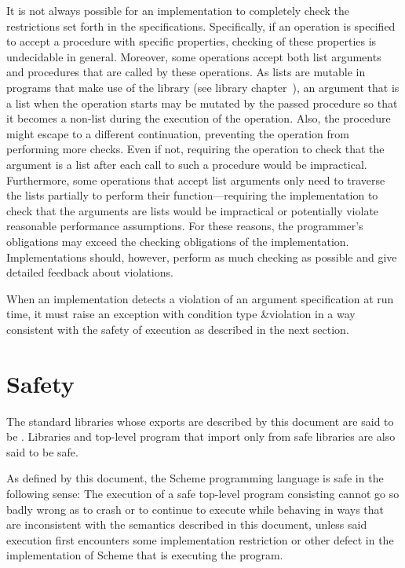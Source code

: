It is not always possible for an implementation to completely check
the restrictions set forth in the specifications.  Specifically, if an
operation is specified to accept a procedure with specific properties,
checking of these properties is undecidable in general.  Moreover,
some operations accept both list arguments and procedures that are
called by these operations.  As lists are mutable in programs that
make use of the  library (see library
chapter~), an argument that is a list
when the operation starts may be mutated by the passed procedure so
that it becomes a non-list during the execution of the operation.
Also, the procedure might escape to a different continuation,
preventing the operation from performing more checks.
Even if not, requiring the operation to check that the argument is a list after
each call to such a procedure would be impractical.  Furthermore, some
operations that accept list arguments only need to traverse the lists
partially to perform their function---requiring the implementation to
check that the arguments are lists would be impractical or potentially
violate reasonable performance assumptions.  For these reasons, the
programmer's obligations may exceed the checking obligations of the
implementation.  Implementations should, however, perform
as much checking as possible and give detailed feedback about
violations.

When an implementation detects a violation of an argument
specification at run time, it must raise an exception with
condition type {\cf\&violation} in a way
consistent with the safety of execution as described in the next
section.

\section{Safety}
\label{safeunsafemodesection}

The standard libraries whose exports are described by this document
are said to be .  Libraries and top-level
program that import only from safe libraries are also said to be safe.

As defined by this document, the Scheme programming language
is safe in the following sense:
The execution of a safe top-level program consisting
cannot go so badly wrong as to crash or to continue to
execute while behaving in ways that are
inconsistent with the semantics described in this document,
unless said execution first encounters some implementation
restriction or other defect in the implementation of Scheme
that is executing the program.

